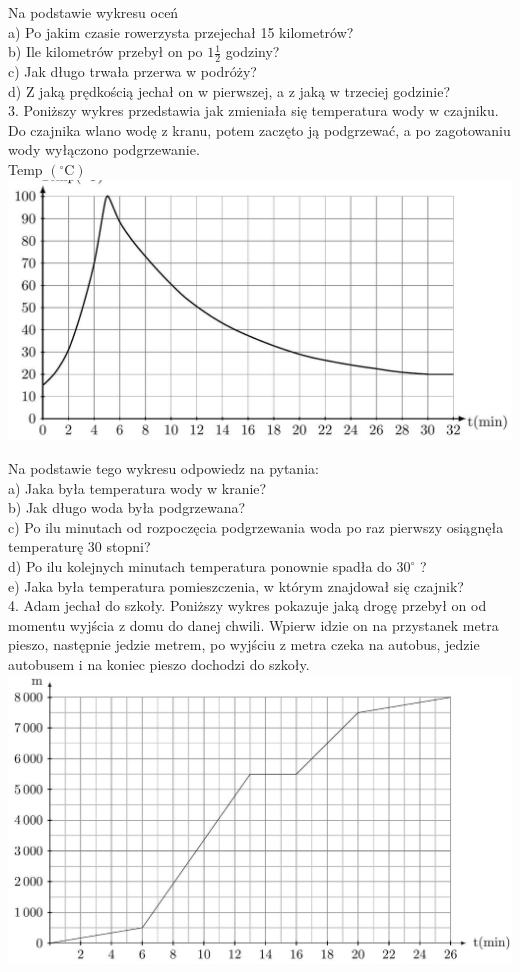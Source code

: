 \documentclass[10pt]{article}
\begin{document}
Na podstawie wykresu oceń\\
a) Po jakim czasie rowerzysta przejechał 15 kilometrów?\\
b) Ile kilometrów przebył on po \(1 \frac{1}{2}\) godziny?\\
c) Jak długo trwała przerwa w podróży?\\
d) Z jaką prędkością jechał on w pierwszej, a z jaką w trzeciej godzinie?\\
3. Poniższy wykres przedstawia jak zmieniała się temperatura wody w czajniku. Do czajnika wlano wodę z kranu, potem zaczęto ją podgrzewać, a po zagotowaniu wody wyłączono podgrzewanie.\\
Temp \(\left({ }^{\circ} \mathrm{C}\right)\)\\
\includegraphics[max width=\textwidth, center]{2024_11_21_e9b4faa005d5be2cc318g-118}

Na podstawie tego wykresu odpowiedz na pytania:\\
a) Jaka była temperatura wody w kranie?\\
b) Jak długo woda była podgrzewana?\\
c) Po ilu minutach od rozpoczęcia podgrzewania woda po raz pierwszy osiągnęła temperaturę 30 stopni?\\
d) Po ilu kolejnych minutach temperatura ponownie spadła do \(30^{\circ}\) ?\\
e) Jaka była temperatura pomieszczenia, w którym znajdował się czajnik?\\
4. Adam jechał do szkoły. Poniższy wykres pokazuje jaką drogę przebył on od momentu wyjścia z domu do danej chwili. Wpierw idzie on na przystanek metra pieszo, następnie jedzie metrem, po wyjściu z metra czeka na autobus, jedzie autobusem i na koniec pieszo dochodzi do szkoły.\\
\includegraphics[max width=\textwidth, center]{2024_11_21_e9b4faa005d5be2cc318g-119}
\end{document}
